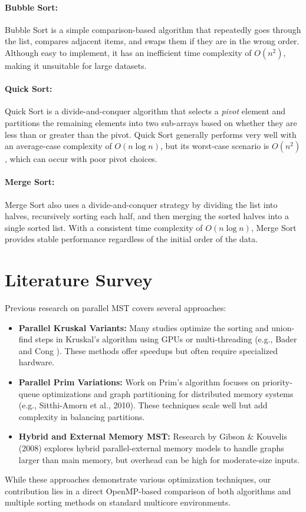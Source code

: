 \documentclass[11pt]{article}
\begin{document}
\paragraph{Bubble Sort:} 
Bubble Sort is a simple comparison-based algorithm that repeatedly goes through the list, compares adjacent items, and swaps them if they are in the wrong order. Although easy to implement, it has an inefficient time complexity of $O(n^2)$, making it unsuitable for large datasets.

\paragraph{Quick Sort:} 
Quick Sort is a divide-and-conquer algorithm that selects a \emph{pivot} element and partitions the remaining elements into two sub-arrays based on whether they are less than or greater than the pivot. Quick Sort generally performs very well with an average-case complexity of $O(n \log n)$, but its worst-case scenario is $O(n^2)$, which can occur with poor pivot choices.

\paragraph{Merge Sort:} 
Merge Sort also uses a divide-and-conquer strategy by dividing the list into halves, recursively sorting each half, and then merging the sorted halves into a single sorted list. With a consistent time complexity of $O(n \log n)$, Merge Sort provides stable performance regardless of the initial order of the data.

\section{Literature Survey}
Previous research on parallel MST covers several approaches:
\begin{itemize}
  \item \textbf{Parallel Kruskal Variants:} Many studies optimize the sorting and union-find steps in Kruskal's algorithm using GPUs or multi-threading (e.g., Bader and Cong \cite{Bader2002}). These methods offer speedups but often require specialized hardware.
  \item \textbf{Parallel Prim Variations:} Work on Prim's algorithm focuses on priority-queue optimizations and graph partitioning for distributed memory systems (e.g., Sitthi-Amorn et al., 2010). These techniques scale well but add complexity in balancing partitions.
  \item \textbf{Hybrid and External Memory MST:} Research by Gibson \& Kouvelis (2008) explores hybrid parallel-external memory models to handle graphs larger than main memory, but overhead can be high for moderate-size inputs.
\end{itemize}
While these approaches demonstrate various optimization techniques, our contribution lies in a direct OpenMP-based comparison of both algorithms and multiple sorting methods on standard multicore environments.
\end{document}
